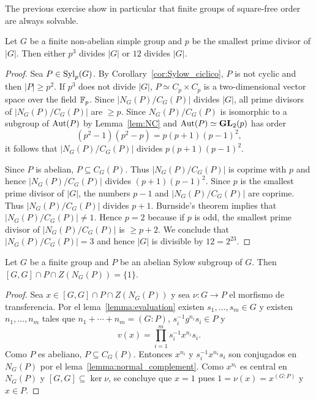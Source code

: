 
The previous exercise show in particular that finite 
groups of square-free order are always solvable. 

\begin{theorem}
	Let $G$ be a finite non-abelian simple group and $p$ be the smallest prime divisor of $|G|$. 
	Then either $p^3$ divides $|G|$ or $12$ divides $|G|$.
\end{theorem}

\begin{proof}
	Sea $P\in\mathrm{Syl}_p(G)$. By Corollary~\ref{cor:Sylow_ciclico}, $P$ is not cyclic  
	and then $|P|\geq p^2$. If $p^3$ does not divide $|G|$, $P\simeq
	C_p\times C_p$ is a two-dimensional vector space over the field $\mathbb{F}_p$. Since 
	$|N_G(P)/C_G(P)|$ divides $|G|$, all prime divisors of 
	$|N_G(P)/C_G(P)|$ are $\geq p$. Since $N_G(P)/C_G(P)$ is isomorphic to a subgroup of 
	$\operatorname{Aut}(P)$ by Lemma~\ref{lem:NC} and 
	$\operatorname{Aut}(P)\simeq\mathbf{GL}_2(p)$ has order 
	\[
	(p^2-1)(p^2-p)=p(p+1)(p-1)^2,
	\]
	it follows that 
	$|N_G(P)/C_G(P)|$ divides $p(p+1)(p-1)^2$.
	
	Since $P$ is abelian,
	$P\subseteq C_G(P)$. Thus $|N_G(P)/C_G(P)|$ is coprime with $p$ and hence 
	$|N_G(P)/C_G(P)|$ divides $(p+1)(p-1)^2$. Since $p$ is the smallest prime divisor of 
	$|G|$, the numbers $p-1$ and $|N_G(P)/C_G(P)|$ are coprime. Thus 
	$|N_G(P)/C_G(P)|$ divides $p+1$. 
	Burnside's theorem implies that $|N_G(P)/C_G(P)|\ne1$.
	Hence $p=2$ because if $p$ is odd, the smallest prime divisor of 
	$|N_G(P)/C_G(P)|$ is $\geq p+2$.  We conclude that  
	$|N_G(P)/C_G(P)|=3$ and hence $|G|$ is divisible by $12=2^23$. 
\end{proof}

\begin{theorem}
	\label{theorem:[GG]PZNG(P)=1}
	Let $G$ be a finite group and $P$ be an abelian Sylow subgroup of $G$. Then
	$[G,G]\cap P\cap Z(N_G(P))=\{1\}$.
\end{theorem}

\begin{proof}
	Sea $x\in [G,G]\cap P\cap Z(N_G(P))$ y sea $\nu\colon G\to P$ el morfismo
	de transferencia.  Por el lema~\ref{lemma:evaluation} existen
	$s_1,\dots,s_m\in G$ y existen $n_1,\dots,n_m$ tales que
	$n_1+\cdots+n_m=(G:P)$, $s_i^{-1}g^{n_i}s_i\in P$ y 
	\[
		v(x)=\prod_{i=1}^m s_i^{-1}x^{n_i}s_i.
	\]
	Como $P$ es abeliano, $P\subseteq C_G(P)$. Entonces $x^{n_i}$ y
	$s_i^{-1}x^{n_i}s_i$ son conjugados en $N_G(P)$ por el
	lema~\ref{lemma:normal_complement}. Como $x^{n_i}$ es central en $N_G(P)$ y
	$[G,G]\subseteq\ker\nu$, se concluye que $x=1$ pues $1=\nu(x)=x^{(G:P)}$ y
	$x\in P$.
\end{proof}

